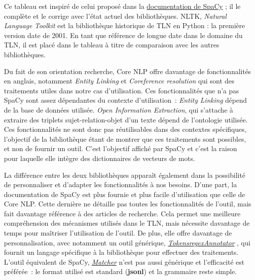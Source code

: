 Ce tableau est inspiré de celui proposé dans la \href{https://spacy.io/usage/facts-figures}{documentation de SpaCy} \cite{spacy-figures}; il le complète et le corrige avec l'état actuel des bibliothèques. NLTK, \textit{Natural Language Toolkit} est la bibliothèque historique de TLN en Python : la première version date de 2001. En tant que référence de longue date dans le domaine du TLN, il est placé dans le tableau à titre de comparaison avec les autres bibliothèques.
\newline

Du fait de son orientation recherche, Core NLP offre davantage de fonctionnalités en anglais, notamment \textit{Entity Linking} et \textit{Coreference resolution} qui sont des traitements utiles dans notre cas d'utilisation. Ces fonctionnalités que n'a pas SpaCy sont assez dépendantes du contexte d'utilisation~: \textit{Entity Linking} dépend de la base de données utilisée. \textit{Open Information Extraction}, qui s'attache à extraire des triplets sujet-relation-objet d'un texte dépend de l'ontologie utilisée. Ces fonctionnalités ne sont donc pas réutilisables dans des contextes spécifiques, l'objectif de la bibliothèque étant de montrer que ces traitements sont possibles, et non de fournir un outil. C'est l'objectif affiché par SpaCy et c'est la raison pour laquelle elle intègre des dictionnaires de vecteurs de mots.
\newline

La différence entre les deux bibliothèques apparaît également dans la possibilité de personnaliser et d'adapter les fonctionnalités à nos besoins. D'une part, la documentation de SpaCy est plus fournie et plus facile d'utilisation que celle de Core NLP. Cette dernière ne détaille pas toutes les fonctionnalités de l'outil, mais fait davantage référence à des articles de recherche. Cela permet une meilleure compréhension des mécanismes utilisés dans le TLN, mais nécessite davantage de temps pour maîtriser l'utilisation de l'outil. De plus, elle offre  davantage de personnalisation, avec notamment un outil générique, \href{https://stanfordnlp.github.io/CoreNLP/tokensregex.html}{\textit{TokensregexAnnotator}} \cite{corenlp-tokensreg}, qui fournit un langage spécifique à la bibliothèque pour effectuer des traitements. L'outil équivalent de SpaCy, \href{https://spacy.io/usage/rule-based-matching}{\textit{Matcher}} \cite{spacy-ruler} n'est pas aussi générique et l'efficacité est préférée~: le format utilisé est standard (\textbf{jsonl}) et la grammaire reste simple.
\newline

